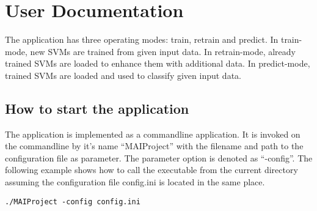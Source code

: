 \appendix
\appendixpage
\addappheadtotoc

\section{User Documentation}\label{sec:userdoc}

The application has three operating modes: train, retrain and predict. In train-mode, new SVMs are trained from given input data. In retrain-mode, already trained SVMs are loaded to enhance them with additional data. In predict-mode, trained SVMs are loaded and used to classify given input data.


\subsection{How to start the application}
The application is implemented as a commandline application. It is invoked on the commandline by it's name "`MAIProject"' with the filename and path to the configuration file as parameter. The parameter option is denoted as "`-config"'. The following example shows how to call the executable from the current directory assuming the configuration file config.ini is located in the same place.
\begin{verbatim}
./MAIProject -config config.ini
\end{verbatim}




